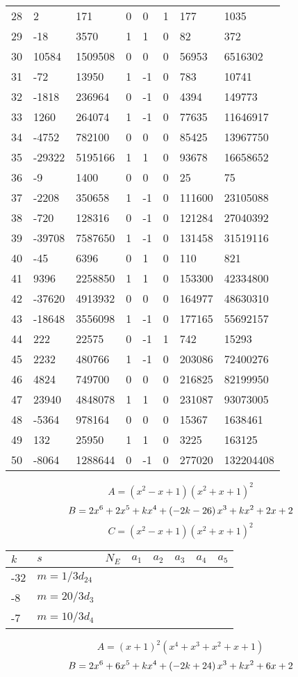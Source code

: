 \documentclass{amsart}
\begin{document}
\begin{longtable}{|l|l|l|lllll|}
28&2&171&0&0&1&177&1035\\
29&-18&3570&1&1&0&82&372\\
30&10584&1509508&0&0&0&56953&6516302\\
31&-72&13950&1&-1&0&783&10741\\
32&-1818&236964&0&-1&0&4394&149773\\
33&1260&264074&1&-1&0&77635&11646917\\
34&-4752&782100&0&0&0&85425&13967750\\
35&-29322&5195166&1&1&0&93678&16658652\\
36&-9&1400&0&0&0&25&75\\
37&-2208&350658&1&-1&0&111600&23105088\\
38&-720&128316&0&-1&0&121284&27040392\\
39&-39708&7587650&1&-1&0&131458&31519116\\
40&-45&6396&0&1&0&110&821\\
41&9396&2258850&1&1&0&153300&42334800\\
42&-37620&4913932&0&0&0&164977&48630310\\
43&-18648&3556098&1&-1&0&177165&55692157\\
44&222&22575&0&-1&1&742&15293\\
45&2232&480766&1&-1&0&203086&72400276\\
46&4824&749700&0&0&0&216825&82199950\\
47&23940&4848078&1&1&0&231087&93073005\\
48&-5364&978164&0&0&0&15367&1638461\\
49&132&25950&1&1&0&3225&163125\\
50&-8064&1288644&0&-1&0&277020&132204408\\
\hline
\end{longtable}
$$A=(x^2
 - x
 + 1)(x^2
 + x
 + 1)^{2}$$
$$B=2\*x^6
 + 2\*x^5
 + k\*x^4
 + \left(-2\*k
 - 26\right) \*x^3
 + k\*x^2
 + 2\*x
 + 2$$
$$C=(x^2
 - x
 + 1)(x^2
 + x
 + 1)^{2}$$
\begin{longtable}{|l|l|l|lllll|}
\hline
$k$ & $s$ & $N_E$ & $a_1$ & $a_2$ & $a_3$ & $a_4$ & $a_5$\\
\hline
-32&$m=1/3d_{24}$&&\multicolumn{5}{c|}{}\\
-8&$m=20/3d_{3}$&&\multicolumn{5}{c|}{}\\
-7&$m=10/3d_{4}$&&\multicolumn{5}{c|}{}\\
\hline
\end{longtable}
$$A=(x
 + 1)^{2}(x^4
 + x^3
 + x^2
 + x
 + 1)$$
$$B=2\*x^6
 + 6\*x^5
 + k\*x^4
 + \left(-2\*k
 + 24\right) \*x^3
 + k\*x^2
 + 6\*x
 + 2$$
\end{document}

